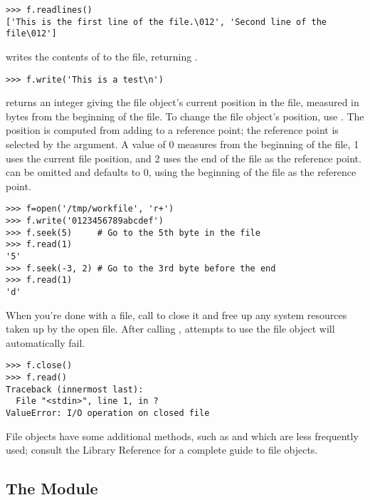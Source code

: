 \documentclass{manual}
\begin{document}
\begin{verbatim}
>>> f.readlines()
['This is the first line of the file.\012', 'Second line of the file\012']
\end{verbatim}

 writes the contents of  to
the file, returning .  

\begin{verbatim}
>>> f.write('This is a test\n')
\end{verbatim}

 returns an integer giving the file object's current
position in the file, measured in bytes from the beginning of the
file.  To change the file object's position, use
.  The position is
computed from adding  to a reference point; the reference
point is selected by the  argument.  A 
value of 0 measures from the beginning of the file, 1 uses the current
file position, and 2 uses the end of the file as the reference point.
 can be omitted and defaults to 0, using the beginning
of the file as the reference point.

\begin{verbatim}
>>> f=open('/tmp/workfile', 'r+')
>>> f.write('0123456789abcdef')
>>> f.seek(5)     # Go to the 5th byte in the file
>>> f.read(1)        
'5'
>>> f.seek(-3, 2) # Go to the 3rd byte before the end
>>> f.read(1)
'd'
\end{verbatim}

When you're done with a file, call  to close it and
free up any system resources taken up by the open file.  After calling
, attempts to use the file object will automatically fail.

\begin{verbatim}
>>> f.close()
>>> f.read()
Traceback (innermost last):
  File "<stdin>", line 1, in ?
ValueError: I/O operation on closed file
\end{verbatim}

File objects have some additional methods, such as 
and  which are less frequently used; consult the
Library Reference for a complete guide to file objects.

\subsection{The  Module}
\label{pickle}
\end{document}
